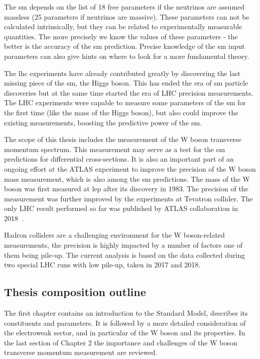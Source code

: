 The \gls{sm} depends on the list of 18 free parameters if the neutrinos are assumed massless (25 parameters if neutrinos are massive). These parameters can not be calculated intrinsically, but they can be related to experimentally measurable quantities. The more precisely we know the values of these parameters - the better is the accuracy of the \gls{sm} prediction. Precise knowledge of the \gls{sm} input parameters can also give hints on where to look for a more fundamental theory. 

The \gls{lhc} experiments have already contributed greatly by discovering the last missing piece of the \gls{sm}, the Higgs boson. This has ended the era of \gls{sm} particle discoveries but at the same time started the era of LHC precision measurements. The LHC experiments were capable to measure some parameters of the \gls{sm} for the first time (like the mass of the Higgs boson), but also could improve the existing measurements, boosting the predictive power of the \gls{sm}. 

The scope of this thesis includes the measurement of the W boson transverse momentum spectrum. This measurement may serve as a test for the \gls{sm} predictions for differential cross-sections. It is also an important part of an ongoing effort at the ATLAS experiment to improve the precision of the W boson mass measurement, which is also among the \gls{sm} predictions. The mass of the W boson was first measured at \gls{lep} after its discovery in 1983. The precision of the measurement was further improved by the experiments at Tevatron collider. The only LHC result performed so far was published by ATLAS collaboration in 2018~\cite{wboson}.

Hadron colliders are a challenging environment for the W boson-related measurements, the precision is highly impacted by a number of factors one of them being pile-up. The current analysis is based on the data collected during two special LHC runs with low pile-up, taken in 2017 and 2018.  
\subsection*{Thesis composition outline}
The first chapter contains an introduction to the Standard Model, describes its constituents and parameters. It is followed by a more detailed consideration of the electroweak sector, and in particular of the W boson and its properties. In the last section of Chapter 2 the importance and challenges of the W boson transverse momentum measurement are reviewed. 

